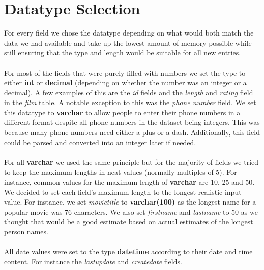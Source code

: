 \documentclass{article}
\begin{document}
\section{Datatype Selection}
	For every field we chose the datatype depending on what would both match the data we had available and take up the lowest amount of memory possible 
	while still ensuring that the type and length would be suitable for all new entries. 
	\\\\
	For most of the fields that were purely filled with numbers we set the type to either \textbf{int} or \textbf{decimal} (depending on whether the number was an integer 
	or a decimal). A few examples of this are the \emph{id} fields and the \emph{length} and \emph{rating} field in the \emph{film} table. A notable exception to this was the 
	\emph{phone number} field. We set this datatype to \textbf{varchar} to allow people to enter their phone numbers in a different format despite all phone numbers in the 
	dataset being integers. This was because many phone numbers need either a plus or a dash. Additionally, this field could be parsed and converted into an integer later if needed.
	\\\\	
	For all \textbf{varchar} we used the same principle but for the majority of fields we tried to keep the maximum lengths in neat values (normally multiples of 5). For instance, common 
	values for the maximum length of \textbf{varchar} are 10, 25 and 50. We decided to set each field’s maximum length to the longest realistic input value.
	For instance, we set \emph{movie\textunderscore title} to \textbf{varchar(100)} as the longest name for a popular movie was 76 characters. We also set \emph{first\textunderscore name} and 
	\emph{last\textunderscore name} to 50 as we thought that would be a good estimate based on actual estimates of the longest person names.
	\\\\
	All date values were set to the type \textbf{datetime} according to their date and time content. For instance the \emph{last\textunderscore update} and
	\emph{create\textunderscore date} fields.
	
\end{document}
